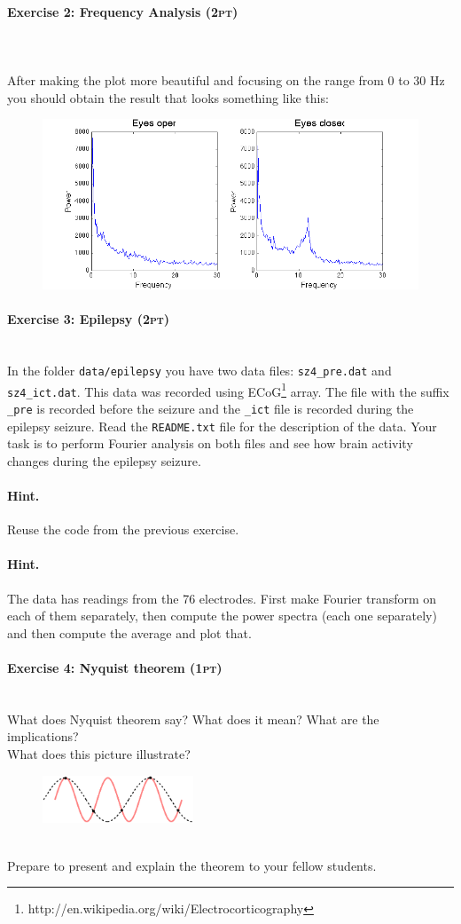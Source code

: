 \documentclass[a4paper,11pt]{article}
\newenvironment{exercise}[3]{\paragraph{Exercise #1: #2 \textsc{(#3pt)}}\ \\}{
\medskip}
\begin{document}
\begin{exercise}{2}{Frequency Analysis}{2}
\ \\
After making the plot more beautiful and focusing on the range from 0 to 30 Hz you should obtain the result that looks something like this:
\begin{figure}[H]
   \centering
   \includegraphics[width=1\textwidth]{fouriereyes.png} 
\end{figure}
\end{exercise}


%
%
\begin{exercise}{3}{Epilepsy}{2}
In the folder \texttt{data/epilepsy} you have two data files: \texttt{sz4\_pre.dat} and \texttt{sz4\_ict.dat}. This data was recorded using ECoG\footnote{http://en.wikipedia.org/wiki/Electrocorticography} array. The file with the suffix \texttt{\_pre} is recorded before the seizure and the \texttt{\_ict} file is recorded during the epilepsy seizure. Read the \texttt{README.txt} file for the description of the data. Your task is to perform Fourier analysis on both files and see how brain activity changes during the epilepsy seizure.
\paragraph{Hint.} Reuse the code from the previous exercise.
\paragraph{Hint.} The data has readings from the 76 electrodes. First make Fourier transform on each of them separately, then compute the power spectra (each one separately) and then compute the average and plot that.
\end{exercise}



%
%
\begin{exercise}{4}{Nyquist theorem}{1}
What does Nyquist theorem say? What does it mean? What are the implications?\\
What does this picture illustrate?
\begin{figure}[H]
   \includegraphics[width=0.4\textwidth]{nyquist.png} 
\end{figure}
\ \\
Prepare to present and explain the theorem to your fellow students.
\end{exercise}
\end{document}
